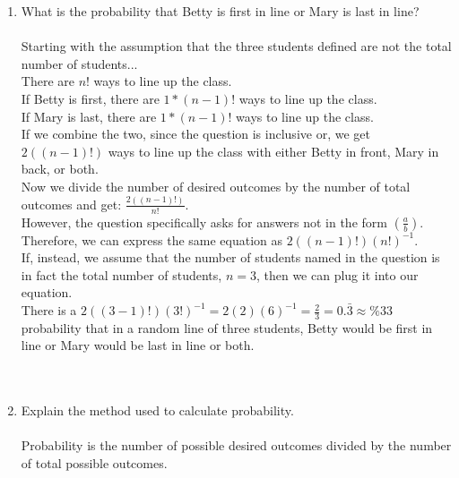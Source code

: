 \documentclass{amsart}
\theoremstyle{definition}
\theoremstyle{Exercise}
\theoremstyle{remark}
\theoremstyle{rule}
\numberwithin{equation}{section}
\begin{document}
  \begin{enumerate}[label=(\alph*)]
    \item What is the probability that Betty is first in line or Mary is last in line?
\\\\
  Starting with the assumption that the three students defined are not the total number of students...\\
  There are $n!$ ways to line up the class.\\ 
  If Betty is first, there are $1 * (n - 1)!$ ways to line up the class.\\
  If Mary is last, there are $1 * (n-1)!$ ways to line up the class.\\
  If we combine the two, since the question is inclusive or, we get $2((n-1)!)$ ways to line up the class with either Betty in front, Mary in back, or both.\\
  Now we divide the number of desired outcomes by the number of total outcomes and get: $\frac{2((n-1)!)}{n!}$.\\
  However, the question specifically asks for answers not in the form $(\frac{a}{b})$.\\
  Therefore, we can express the same equation as $2((n-1)!)(n!)^{-1}$.\\
  If, instead, we assume that the number of students named in the question is in fact the total number of students, $n = 3$, then we can plug it into our equation.\\
  There is a $2((3-1)!)(3!)^{-1} = 2(2)(6)^{-1} = \frac{2}{3} = 0.\bar{3} \approx \%33$ probability that in a random line of three students, Betty would be first in line or Mary would be last in line or both.\\
  
\\\\
    \item Explain the method used to calculate probability.
\\\\
  Probability is the number of possible desired outcomes divided by the number of total possible outcomes.
\\\\
  \end{enumerate}
  \newpage
\end{document}
